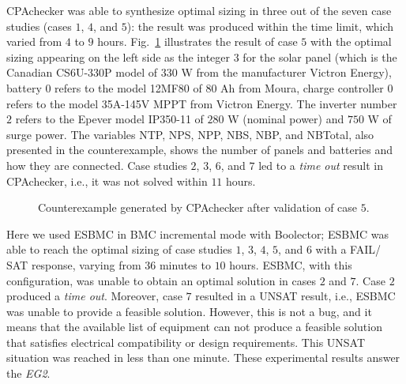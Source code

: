 \documentclass[10pt,journal,compsoc]{IEEEtran}
\begin{document}
CPAchecker was able to synthesize optimal sizing in three out of the seven case studies (cases $1$, $4$, and $5$): the result was produced within the time limit, which varied from $4$ to $9$ hours. 
Fig.~\ref{fig:CPAoptc1} illustrates the result of case $5$ with the optimal sizing appearing on the left side as the integer $3$ for the solar panel (which is the Canadian CS6U-330P model of $330$ W from the manufacturer Victron Energy), battery $0$ refers to the model 12MF80 of $80$ Ah from Moura, charge controller $0$ refers to the model 35A-145V MPPT from Victron Energy. The inverter number $2$ refers to the Epever model IP350-11 of $280$ W (nominal power) and $750$ W of surge power. The variables NTP, NPS, NPP, NBS, NBP, and NBTotal, also presented in the counterexample, shows the number of panels and batteries and how they are connected.
Case studies $2$, $3$, $6$, and $7$ led to a \textit{time out} result in CPAchecker, i.e., it was not solved within $11$ hours.  
%
\begin{figure}[h]
\centering
\caption{Counterexample generated by CPAchecker after validation of case $5$.}
\label{fig:CPAoptc1}
\end{figure}

Here we used ESBMC in BMC incremental mode with Boolector; ESBMC was able to reach the optimal sizing of case studies $1$, $3$, $4$, $5$, and $6$ with a FAIL/ SAT response, varying from $36$ minutes to $10$ hours. ESBMC, with this configuration, was unable to obtain an optimal solution in cases $2$ and $7$. Case $2$ produced a \textit{time out}. Moreover, case $7$ resulted in a UNSAT result, i.e., ESBMC was unable to provide a feasible solution. However, this is not a bug, and it means that the available list of equipment can not produce a feasible solution that satisfies electrical compatibility or design requirements. This UNSAT situation was reached in less than one minute. These experimental results answer the \textit{EG2}.
\end{document}
